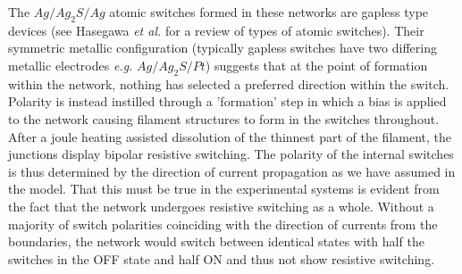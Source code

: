 \documentclass[aps,prl,preprint,groupedaddress]{revtex4-1}
\begin{document}
The $Ag/Ag_2 S/Ag$ atomic switches formed in these networks are gapless
type devices (see Hasegawa \textit{et al.} \cite{Hasegawa2012} for a
review of types of atomic switches).  Their symmetric metallic
configuration (typically gapless switches have two differing metallic
electrodes \textit{e.g.} $Ag/Ag_2 S/Pt$) suggests that at
the point of formation within the network, nothing has selected a
preferred direction within the switch.  Polarity is instead instilled
through a 'formation' step in which a bias is applied to the network
causing filament structures to form in the switches throughout. After
a joule heating assisted dissolution of the thinnest part of the filament,
the junctions display bipolar resistive switching.  The polarity of the
internal switches is thus determined by the direction of current propagation
as we have assumed in the model.  That this must be true in the experimental
systems is evident from the fact that the network undergoes resistive
switching as a whole.  Without a majority of switch polarities coinciding
with the direction of currents from the boundaries, the network would switch
between identical states with half the switches in the OFF state and half ON
and thus not show resistive switching.

%


\end{document}
